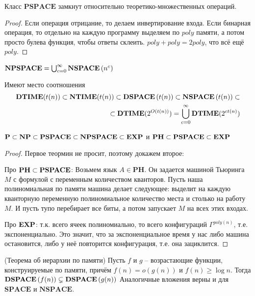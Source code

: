 \begin{lemma}
    Класс $\mathbf{PSPACE}$ замкнут  относительно теоретико-множественных операций.
\end{lemma}

\begin{proof}
    Если операция отрицание, то делаем инвертирование входа. Если бинарная операция, то отдельно на каждую программу выделяем по $poly$ памяти, а потом просто булева функция, чтобы ответы склеить. $poly + poly = 2 poly$, что всё ещё $poly$.
\end{proof}

\begin{definition} 
$\mathbf{NPSPACE}=\bigcup_{c=0}^{\infty}\textbf{NSPACE}\left({n^c}\right)$
\end{definition}

\begin{theorem}
Имеют место соотношения 
\begin{align*}
    \mathbf{DTIME}(t(n)) \subset \mathbf{NTIME}(t(n)) \subset \textbf{DSPACE}\left({t(n)}\right) \subset \textbf{NSPACE}\left({t(n)}\right) \subset \\ \subset \mathbf{DTIME}(2^{O(t(n))}) = \bigcup_{c=0}^{\infty}\mathbf{DTIME}(2^{ct(n)})
\end{align*}
\end{theorem}

\begin{corollary}
    $\textbf{P} \subset \textbf{NP} \subset \mathbf{PSPACE} \subset \mathbf{NPSPACE} \subset \textbf{EXP}$ и $\mathbf{PH} \subset \textbf{PSPACE} \subset \textbf{EXP}$
\end{corollary}

\begin{proof}
    Первое теормин не просит, поэтому докажем второе:
    
Про $\mathbf{PH} \subset \textbf{PSPACE}$: Возьмем язык $A \in \mathbf{PH}$. Он задается машиной Тьюринга $M$ с формулой с переменным количеством кванторов. Пусть наша полиномиальная по памяти машина делает следующее: выделит на каждую кванторную переменную полиномиальное количество места и столько на работу $M$. И пусть тупо перебирает все биты, а потом запускает $M$ на всех этих входах.

Про $\textbf{EXP}$: т.к. всего ячеек полиномиально, то всего конфигураций $\Gamma^{poly(n)}$, т.е. экспоненциально. Это значит, что за экспоненциальное время у нас либо машина остановится, либо у неё повторится конфигурация, т.е. она зациклится.
\end{proof}

\begin{theorem}
    (Теорема об иерархии по памяти)
    Пусть $f$ и $g$ -- возрастающие функции, конструируемые по памяти, причём $f(n) = o(g(n))$ и $f(n) \geq \log n$. Тогда $\textbf{DSPACE}\left({f(n)}\right)\subsetneq \textbf{DSPACE}\left({g(n)}\right)$ Аналогичные вложения верны и для $\mathbf{SPACE}$ и $\mathbf{NSPACE}$.
\end{theorem}

